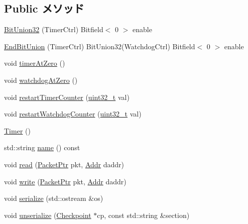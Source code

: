 \subsection*{Public メソッド}
\begin{DoxyCompactItemize}
\item 
\hyperlink{classCpuLocalTimer_1_1Timer_aeae80462edd494698c490d195af1cf9f}{BitUnion32} (TimerCtrl) Bitfield$<$ 0 $>$ enable
\item 
\hyperlink{classCpuLocalTimer_1_1Timer_a4ac1bc7cc3873c99b8469db37f16e565}{EndBitUnion} (TimerCtrl) BitUnion32(WatchdogCtrl) Bitfield$<$ 0 $>$ enable
\item 
void \hyperlink{classCpuLocalTimer_1_1Timer_a84a1ec7607453e04aa1cdada60013803}{timerAtZero} ()
\item 
void \hyperlink{classCpuLocalTimer_1_1Timer_a76d03f76bc4ae7f6d6671b6ac0cd2f7e}{watchdogAtZero} ()
\item 
void \hyperlink{classCpuLocalTimer_1_1Timer_a520062c40a7a6907757be6a19ee1c0b7}{restartTimerCounter} (\hyperlink{Type_8hh_a435d1572bf3f880d55459d9805097f62}{uint32\_\-t} val)
\item 
void \hyperlink{classCpuLocalTimer_1_1Timer_a88d47ac274ae3a0b35888ac8fa88fb78}{restartWatchdogCounter} (\hyperlink{Type_8hh_a435d1572bf3f880d55459d9805097f62}{uint32\_\-t} val)
\item 
\hyperlink{classCpuLocalTimer_1_1Timer_a6a8bc5014802d569f6d01c4f36121a81}{Timer} ()
\item 
std::string \hyperlink{classCpuLocalTimer_1_1Timer_a37627d5d5bba7f4a8690c71c2ab3cb07}{name} () const 
\item 
void \hyperlink{classCpuLocalTimer_1_1Timer_a6ecbcc960e1c0cd0a0f4c64e7ae58d14}{read} (\hyperlink{classPacket}{PacketPtr} pkt, \hyperlink{base_2types_8hh_af1bb03d6a4ee096394a6749f0a169232}{Addr} daddr)
\item 
void \hyperlink{classCpuLocalTimer_1_1Timer_a26d6a1d80de386690a8ad73932f83d96}{write} (\hyperlink{classPacket}{PacketPtr} pkt, \hyperlink{base_2types_8hh_af1bb03d6a4ee096394a6749f0a169232}{Addr} daddr)
\item 
void \hyperlink{classCpuLocalTimer_1_1Timer_a53e036786d17361be4c7320d39c99b84}{serialize} (std::ostream \&os)
\item 
void \hyperlink{classCpuLocalTimer_1_1Timer_af22e5d6d660b97db37003ac61ac4ee49}{unserialize} (\hyperlink{classCheckpoint}{Checkpoint} $\ast$cp, const std::string \&section)
\end{DoxyCompactItemize}
